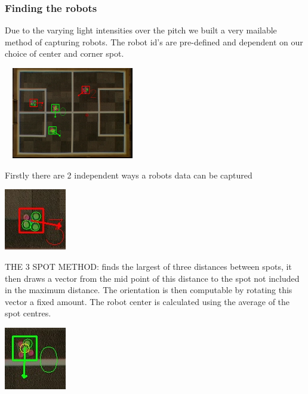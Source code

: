 \documentclass[a4paper,12pt]{article}
\begin{document}
\subsubsection{Finding the robots}
Due to the varying light intensities over the pitch we built a very mailable method of capturing robots. The robot id's are pre-defined and dependent on our choice of center and corner spot. \newline
\begin{center}
\includegraphics[height=40mm,width=60mm]{ex1.jpg}\newline
\end{center}
Firstly there are 2 independent ways a robots data can be captured \newline \newline
\begin{minipage}{0.2\textwidth}
\includegraphics[scale=0.7]{3spot.jpg}
\end{minipage}
\begin{minipage}{0.8\textwidth}\raggedleft   
THE 3 SPOT METHOD: finds the largest of three distances between spots, it then draws a vector from the mid point of this distance to the spot not included in the maximum distance. The orientation is then computable by rotating this vector a fixed amount. The robot center is calculated using the average of the spot centres.
\end{minipage}\newline \newline
\begin{minipage}{0.2\textwidth}
\includegraphics[scale=0.7]{2spot.jpg}
\end{minipage}
\end{document}
